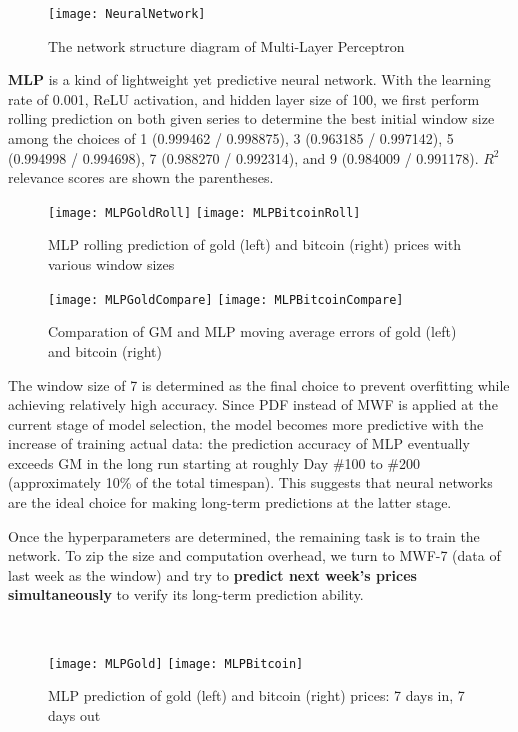 \documentclass{mcmthesis}
\begin{document}
{	\begin{figure}[h]
		\centering \texttt{[image: NeuralNetwork]}
		\caption{The network structure diagram of Multi-Layer Perceptron}
	\end{figure}
	
	\textbf{MLP} is a kind of lightweight yet predictive neural network. With the learning rate of 0.001, ReLU activation, and hidden layer size of 100, we first perform rolling prediction on both given series to determine the best initial window size among the choices of 1 (0.999462 / 0.998875), 3 (0.963185 / 0.997142), 5 (0.994998 / 0.994698), 7 (0.988270 / 0.992314), and 9 (0.984009 / 0.991178). $R^2$ relevance scores are shown the parentheses. 
	
	\begin{figure}[h]
		\centering \texttt{[image: MLPGoldRoll]}
		\centering \texttt{[image: MLPBitcoinRoll]}
		\caption{MLP rolling prediction of gold (left) and bitcoin (right) prices with various window sizes}
	\end{figure}
	
	\begin{figure}[h]
		\centering \texttt{[image: MLPGoldCompare]}
		\centering \texttt{[image: MLPBitcoinCompare]}
		\caption{Comparation of GM and MLP moving average errors of gold (left) and bitcoin (right)}
	\end{figure}

	The window size of 7 is determined as the final choice to prevent overfitting while achieving relatively high accuracy. Since PDF instead of MWF is applied at the current stage of model selection, the model becomes more predictive with the increase of training actual data: the prediction accuracy of MLP eventually exceeds GM in the long run starting at roughly Day \#100 to \#200 (approximately 10\% of the total timespan). This suggests that neural networks are the ideal choice for making long-term predictions at the latter stage. 
	
	Once the hyperparameters are determined, the remaining task is to train the network. To zip the size and computation overhead, we turn to MWF-7 (data of last week as the window) and try to \textbf{predict next week's prices simultaneously} to verify its long-term prediction ability. 
	
	~\\
	
	\begin{figure}[h]
		\centering \texttt{[image: MLPGold]}
		\centering \texttt{[image: MLPBitcoin]}
		\caption{MLP prediction of gold (left) and bitcoin (right) prices: 7 days in, 7 days out}
	\end{figure}
	
}
\end{document}
